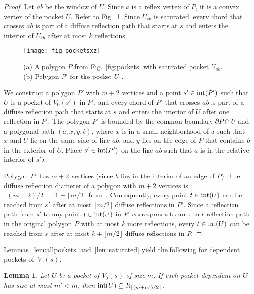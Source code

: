 \documentclass[12pt]{article}
\newcommand{\floor}[1]{{\lfloor #1 \rfloor}}
\newtheorem{lemma}{Lemma}
\begin{document}
\begin{proof}
Let $ab$ be the window of $U$.
Since $a$ is a reflex vertex of $P$, it is a convex vertex of the pocket $U$.
Refer to Fig.~\ref{fig:pprime}. Since $U_{ab}$ is saturated, every chord that crosses $ab$
is part of a diffuse reflection path that starts at $s$
and enters the interior of $U_{ab}$ after at most $k$ reflections.

\begin{figure}[htp]
  \centering
  \texttt{[image: fig-pocketsxz]}
  \caption{\label{fig:pprime}
(a) A polygon $P$ from Fig.~\ref{fig:pockets} with saturated pocket $U_{ab}$.
(b) Polygon $P'$ for the pocket $U_1$.}
\end{figure}

We construct a polygon $P'$ with $m+2$ vertices and a point $s'\in {\rm int}(P')$ such that $U$ is a pocket of $V_0(s')$ in $P'$,
and every chord of $P'$ that crosses $ab$ is part of a diffuse reflection path that starts at $s$ and enters the interior of $U$ after one reflection in $P'$.
The polygon $P'$ is bounded by the common boundary $\partial P\cap U$ and a polygonal path $(a,x,y,b)$, where $x$ is in a small neighborhood of $a$ such that $x$ and $U$ lie on the same side of line $ab$, and $y$ lies on the edge of $P$ that contains $b$ in the exterior of $U$. Place $s'\in {\rm int}(P')$ on the line $ab$ such that $a$ is in the relative interior of $s'b$.

Polygon $P'$ has $m+2$ vertices (since $b$ lies in the interior of an edge of $P$). The diffuse reflection diameter of a polygon with $m+2$ vertices is $\floor{(m+2)/2}-1 =\floor{m/2}$ from~\cite{Us}. Consequently, every point $t\in {\rm int}(U)$ can be reached from $s'$ after at most $\floor{m/2}$ diffuse reflections in $P'$.
Since a reflection path from $s'$ to any point $t\in {\rm int}(U)$ in $P'$ corresponds to an $s$-to-$t$ reflection path in the original polygon $P$
with at most $k$ more reflections, every $t\in {\rm int}(U)$ can be reached from $s$ after at most $k+\floor{m/2}$ diffuse reflections in $P$.
\end{proof}

Lemmas~\ref{lem:allpockets} and~\ref{lem:saturated} yield the following for dependent pockets of~$V_0(s)$.

\begin{lemma}\label{lem:dependent}
Let $U$ be a pocket of $V_0(s)$ of size $m$.
If each pocket dependent on $U$ has size at most $m'< m$,
  then ${\rm int}(U)\subseteq R_{\floor{(m+m')/2}}$.
\end{lemma}
\end{document}
